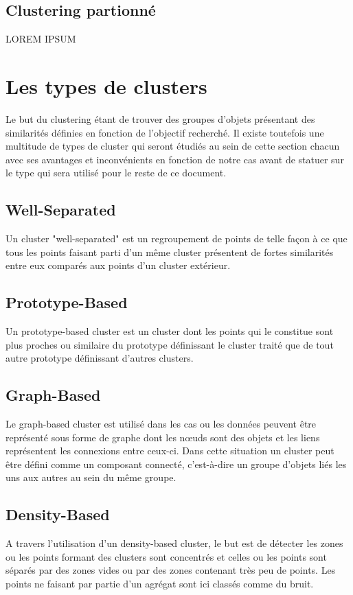 \documentclass[memoire.tex]{subfiles}
\begin{document}
\newpage
\subsection{Clustering partionné}
LOREM IPSUM

\section{Les types de clusters}

Le but du clustering étant de trouver des groupes d'objets présentant des similarités
définies en fonction de l'objectif recherché. Il existe toutefois une multitude de types de cluster qui seront étudiés au sein de cette section chacun avec ses avantages et inconvénients en fonction de notre cas avant de statuer sur le type qui sera utilisé pour le reste de ce document.

\subsection{Well-Separated}
Un cluster "well-separated" est un regroupement de points de telle façon à ce que tous les points faisant parti d'un même cluster présentent de fortes similarités entre eux comparés aux points d'un cluster extérieur.
\subsection{Prototype-Based}

Un prototype-based cluster est un cluster dont les points qui le constitue sont plus proches ou similaire du prototype définissant le cluster traité que de tout autre prototype définissant d'autres clusters.

\subsection{Graph-Based}
Le graph-based cluster est utilisé dans les cas ou les données peuvent être représenté sous forme de graphe dont les nœuds sont des objets et les liens représentent les connexions entre ceux-ci. Dans cette situation un cluster peut être défini comme un composant connecté,  c'est-à-dire un groupe d'objets liés les uns aux autres au sein du même groupe.

\subsection{Density-Based}
A travers l'utilisation d'un density-based cluster, le but est de détecter les zones ou les points formant des clusters sont concentrés et celles ou les points sont séparés par des zones vides ou par des zones contenant très peu de points. Les points ne faisant par partie d'un agrégat sont ici classés comme du bruit.
\end{document}
